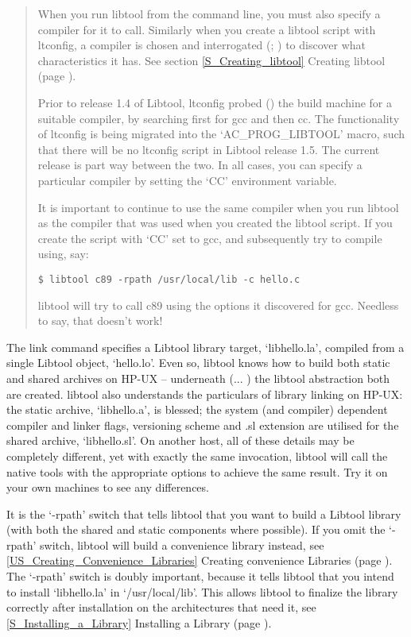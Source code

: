 \begin{quote}
When you run libtool from the command line, you must also specify a compiler 
for it to call. Similarly when you create a libtool script with ltconfig, a 
compiler is chosen and interrogated ({\MaQ{}}; {\McQ{}}) to discover what 
characteristics it has. See section \ref{S_Creating_libtool} Creating libtool
(page \pageref{S_Creating_libtool}). 

Prior to release 1.4 of Libtool, ltconfig probed ({\MfQ{}}) the build machine for a
suitable compiler, by searching first for gcc and then cc. The functionality 
of ltconfig is being migrated into the `AC\_{}PROG\_{}LIBTOOL' macro, such 
that there will be no ltconfig script in Libtool release 1.5. The current 
release is part way between the two. In all cases, you can specify a 
particular compiler by setting the `CC' environment variable. 


It is important to continue to use the same compiler when you run libtool as the compiler that was used when you created the libtool script. If you create the script with `CC' set to gcc, and subsequently try to compile using, say: 

 
\begin{verbatim}
$ libtool c89 -rpath /usr/local/lib -c hello.c
\end{verbatim}

libtool will try to call c89 using the options it discovered for gcc. Needless 
to say, that doesn't work! 
\end{quote}

The link command specifies a Libtool library target, `libhello.la', compiled 
from a single Libtool object, `hello.lo'. Even so, libtool knows how to build 
both static and shared archives on HP-UX -- underneath ({\MaQ{}}... {\MaQ{}}) the libtool 
abstraction both are created. libtool also understands the particulars of 
library linking on HP-UX: the static archive, `libhello.a', is blessed;
the system (and compiler) dependent compiler and linker flags, versioning 
scheme and .sl extension are utilised for the shared archive, `libhello.sl'.
On another host, all of these details may be completely different, yet with 
exactly the same invocation, libtool will call the native tools with the 
appropriate options to achieve the same result. Try it on your own machines 
to see any differences. 


It is the `-rpath' switch that tells libtool that you want to build a Libtool 
library (with both the shared and static components where possible). If you 
omit the `-rpath' switch, libtool will build a convenience library instead,
see \ref{US_Creating_Convenience_Libraries} Creating convenience Libraries
(page \pageref{US_Creating_Convenience_Libraries}). The `-rpath' switch is 
doubly important, because it tells libtool that you intend to 
install `libhello.la' in `/usr/local/lib'. This allows libtool to finalize the 
library correctly after installation on the architectures that need it,
see \ref{S_Installing_a_Library} Installing a Library
(page \pageref{S_Installing_a_Library}).


